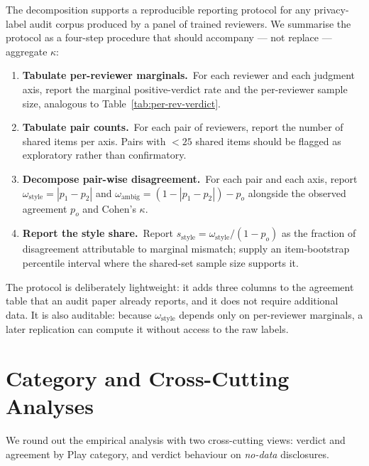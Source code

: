 \documentclass[11pt,a4paper]{article}
\begin{document}
The decomposition supports a reproducible reporting protocol for any
privacy-label audit corpus produced by a panel of trained reviewers.
We summarise the protocol as a four-step procedure that should
accompany --- not replace --- aggregate $\kappa$:

\begin{enumerate}[leftmargin=*,topsep=2pt,itemsep=2pt]
\item \textbf{Tabulate per-reviewer marginals.}\ For each reviewer
       and each judgment axis, report the marginal positive-verdict
       rate and the per-reviewer sample size, analogous to
       Table~\ref{tab:per-rev-verdict}.
\item \textbf{Tabulate pair counts.}\ For each pair of reviewers,
       report the number of shared items per axis. Pairs with $<25$
       shared items should be flagged as exploratory rather than
       confirmatory.
\item \textbf{Decompose pair-wise disagreement.}\ For each pair and
       each axis, report $\omega_{\text{style}}=|p_1-p_2|$ and
       $\omega_{\text{ambig}}=(1-|p_1-p_2|)-p_o$ alongside the
       observed agreement $p_o$ and Cohen's $\kappa$.
\item \textbf{Report the style share.}\ Report
       $s_{\text{style}}=\omega_{\text{style}}/(1-p_o)$ as the
       fraction of disagreement attributable to marginal mismatch;
       supply an item-bootstrap percentile interval where the
       shared-set sample size supports it.
\end{enumerate}

The protocol is deliberately lightweight: it adds three columns to
the agreement table that an audit paper already reports, and it
does not require additional data. It is also auditable: because
$\omega_{\text{style}}$ depends only on per-reviewer marginals, a
later replication can compute it without access to the raw labels.

\section{Category and Cross-Cutting Analyses}
\label{sec:category}

We round out the empirical analysis with two cross-cutting views:
verdict and agreement by Play category, and verdict behaviour on
\emph{no-data} disclosures.
\end{document}
